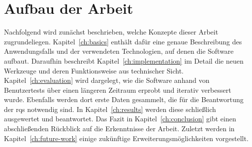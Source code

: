 \section{Aufbau der Arbeit}\label{sec:structure}

Nachfolgend wird zunächst beschrieben, welche Konzepte dieser Arbeit zugrundeliegen.
Kapitel~\ref{ch:basics} enthält dafür eine genaue Beschreibung des Anwendungsfalls und der verwendeten Technologien, auf denen die Software aufbaut.
Daraufhin beschreibt Kapitel~\ref{ch:implementation} im Detail die neuen Werkzeuge und deren Funktionsweise aus technischer Sicht.
Kapitel~\ref{ch:evaluation} wird dargelegt, wie die Software anhand von Benutzertests über einen längeren Zeitraum erprobt und iterativ verbessert wurde.
Ebenfalls werden dort erste Daten gesammelt, die für die Beantwortung der \acp{rq} notwendig sind.
In Kapitel~\ref{ch:results} werden diese schließlich ausgewertet und beantwortet.
Das Fazit in Kapitel~\ref{ch:conclusion} gibt einen abschließenden Rückblick auf die Erkenntnisse der Arbeit.
Zuletzt werden in Kapitel~\ref{ch:future-work} einige zukünftige Erweiterungsmöglichkeiten vorgestellt.
